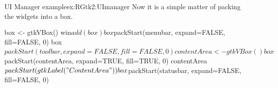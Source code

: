 \begin{example}{UI Manager example}{ex:RGtk2:UImanager}
Now it is a simple matter of packing the widgets into a box.
\begin{Schunk}
\begin{Sinput}
 box <- gtkVBox()
 win$add(box)
 box$packStart(menubar, expand=FALSE, fill=FALSE, 0)
 box$packStart(toolbar, expand=FALSE, fill= FALSE, 0)
 contentArea <- gtkVBox()
 box$packStart(contentArea, expand=TRUE, fill=TRUE, 0)
 contentArea$packStart(gtkLabel("Content Area"))
 box$packStart(statusbar, expand=FALSE, fill=FALSE, 0)
\end{Sinput}
\end{Schunk}

\end{example}














